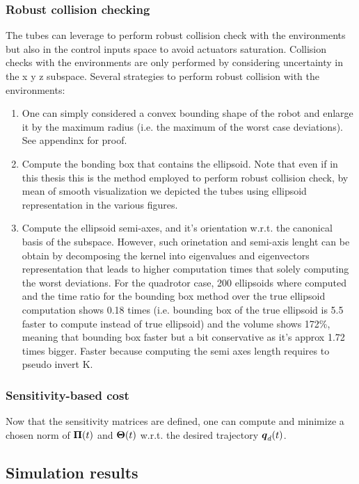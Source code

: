 \subsubsection{Robust collision checking}
The tubes can leverage to perform robust collision check with the environments but also in the control inputs space to avoid actuators saturation. 
Collision checks with the environments are only performed by considering uncertainty in the x y z subspace.
Several strategies to perform robust collision with the environments:
\begin{enumerate}
    \item One can simply considered a convex bounding shape of the robot and enlarge it by the maximum radius (i.e. the maximum of the worst case deviations). See appendinx for proof.
    \item Compute the bonding box that contains the ellipsoid. Note that even if in this thesis this is the method employed to perform robust collision check, by mean of smooth visualization we depicted the tubes using ellipsoid representation in the various figures.
    \item Compute the ellipsoid semi-axes, and it's orientation w.r.t. the canonical basis of the subspace. However, such orinetation and semi-axis lenght can be obtain by decomposing the kernel into eigenvalues and eigenvectors representation that leads to higher computation times that solely computing the worst deviations. For the quadrotor case, 200 ellipsoids where computed and the time ratio for the bounding box method over the true ellipsoid computation shows 0.18 times (i.e. bounding box of the true ellipsoid is 5.5 faster to compute instead of true ellipsoid) and the volume shows 172\%, meaning that bounding box faster but a bit conservative as it's approx 1.72 times bigger. Faster because computing the semi axes length requires to pseudo invert K.
\end{enumerate}

\subsubsection{Sensitivity-based cost}
Now that the sensitivity matrices are defined, one can compute and minimize a chosen norm of $\boldsymbol{\Pi}(t)$ and $\boldsymbol{\Theta}(t)$ w.r.t. the desired trajectory $\boldsymbol{q}_d(t)$.

\subsection{Simulation results}
